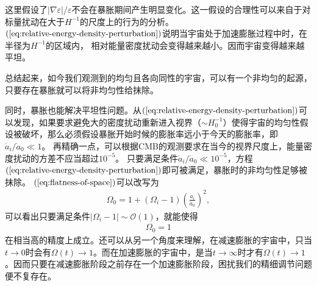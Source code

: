 这里假设了$|\nabla\varepsilon|/\varepsilon$不会在暴胀期间产生明显变化。这一假设的合理性可以来自于对标量扰动在大于$H^{-1}$的尺度上的行为的分析。
$(\ref{eq:relative-energy-density-perturbation})$说明当宇宙处于加速膨胀过程中时，在半径为$H^{-1}$的区域内，
相对能量密度扰动会变得越来越小。因而宇宙变得越来越平坦。

总结起来，如今我们观测到的均匀且各向同性的宇宙，可以有一个非均匀的起源，只要存在暴胀就可以将非均匀性给抹除。

同时，暴胀也能解决平坦性问题。从$(\ref{eq:relative-energy-density-perturbation})$可以发现，如果要求避免大的密度扰动重新进入视界（$\sim
H_0^{-1}$）使得宇宙的均匀性假设被破坏，那么必须假设暴胀开始时候的膨胀率远小于今天的膨胀率，即$\dot{a}_{i}/\dot{a}_0\ll
1$。
再精确一点，可以根据CMB的观测要求在当今的视界尺度上，能量密度扰动的方差不应当超过$10^{-5}$。
只要满足条件$\dot{a}_{i}/\dot{a}_0\ll
10^{-5}$，方程$(\ref{eq:relative-energy-density-perturbation})$即可被满足，暴胀时的非均匀性足够被抹除。
$(\ref{eq:flatness-of-space})$可以改写为
\begin{align}
  \Omega_0=1+{\left(\Omega_{i}-1\right)}{\left(\frac{\dot{a}_{i}}{\dot{a}_0}\right)}^2,
\end{align}
可以看出只要满足条件$|\Omega_{i}-1|\sim\mathcal{O}(1)$，就能使得
\begin{align}
  \Omega_0=1
\end{align}
在相当高的精度上成立。还可以从另一个角度来理解，在减速膨胀的宇宙中，只当$t\rightarrow
0$时会有$\Omega(t)\rightarrow
1$。而在加速膨胀的宇宙中，是当$t\rightarrow\infty$时才有$\Omega(t)\rightarrow
1$。因而只要在减速膨胀阶段之前存在一个加速膨胀阶段，困扰我们的精细调节问题便不复存在。



